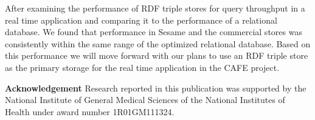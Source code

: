 \documentclass{llncs}
\begin{document}
After examining the performance of RDF triple stores for query throughput in a real time application and comparing it to the performance of a relational database.
We found that performance in Sesame and the commercial stores was consistently within the same range of the optimized relational database.
Based on this performance we will move forward with our plans to use an RDF triple store as the primary storage for the real time application in the CAFE project.

\medskip
\noindent
\textbf{Acknowledgement} Research reported in this publication was supported by the National Institute of General Medical Sciences of the National Institutes of Health under award number 1R01GM111324.



\end{document}

